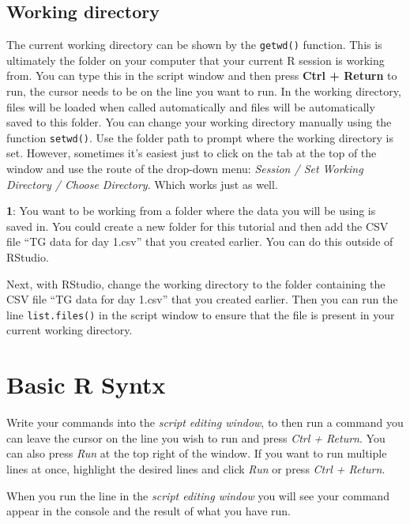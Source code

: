 \documentclass[
]{book}
\makeatletter
\newenvironment{kframe}{%
\medskip{}
\setlength{\fboxsep}{.8em}
 \def\at@end@of@kframe{}%
 \ifinner\ifhmode%
  \def\at@end@of@kframe{\end{minipage}}%
  \begin{minipage}{\columnwidth}%
 \fi\fi%
 \def\FrameCommand##1{\hskip\@totalleftmargin \hskip-\fboxsep
 \colorbox{shadecolor}{##1}\hskip-\fboxsep
     \hskip-\linewidth \hskip-\@totalleftmargin \hskip\columnwidth}%
 \MakeFramed {\advance\hsize-\width
   \@totalleftmargin\z@ \linewidth\hsize
   \@setminipage}}%
 {\par\unskip\endMakeFramed%
 \at@end@of@kframe}
\newenvironment{rmdblock}[1]
  {
  \begin{itemize}
  \renewcommand{\labelitemi}{
    \raisebox{-.7\height}[0pt][0pt]{
      {\setkeys{Gin}{width=3em,keepaspectratio}\texttt{[image: images/\#1]}}
    }
  }
  \setlength{\fboxsep}{1em}
  \begin{kframe}
  \item
  }
  {
  \end{kframe}
  \end{itemize}
  }
\newenvironment{rmdquiz}
  {\begin{rmdblock}{quiz}}
  {\end{rmdblock}}
\makeatother
\begin{document}
\hypertarget{working-directory}{%
\subsection{Working directory}\label{working-directory}}

The current working directory can be shown by the \texttt{getwd()} function. This is ultimately the folder on your computer that your current R session is working from. You can type this in the script window and then press \textbf{Ctrl + Return} to run, the cursor needs to be on the line you want to run. In the working directory, files will be loaded when called automatically and files will be automatically saved to this folder. You can change your working directory manually using the function \texttt{setwd()}. Use the folder path to prompt where the working directory is set. However, sometimes it's easiest just to click on the tab at the top of the window and use the route of the drop-down menu: \emph{Session / Set Working Directory / Choose Directory}. Which works just as well.

\begin{rmdquiz}
\textbf{1}: You want to be working from a folder where the data you will be using is saved in. You could create a new folder for this tutorial and then add the CSV file ``TG data for day 1.csv'' that you created earlier. You can do this outside of RStudio.

Next, with RStudio, change the working directory to the folder containing the CSV file ``TG data for day 1.csv'' that you created earlier. Then you can run the line \texttt{list.files()} in the script window to ensure that the file is present in your current working directory.
\end{rmdquiz}

\hypertarget{basic-r-syntx}{%
\section{Basic R Syntx}\label{basic-r-syntx}}

Write your commands into the \emph{script editing window}, to then run a command you can leave the cursor on the line you wish to run and press \emph{Ctrl + Return}. You can also press \emph{Run} at the top right of the window. If you want to run multiple lines at once, highlight the desired lines and click \emph{Run} or press \emph{Ctrl + Return}.

When you run the line in the \emph{script editing window} you will see your command appear in the console and the result of what you have run.
\end{document}
